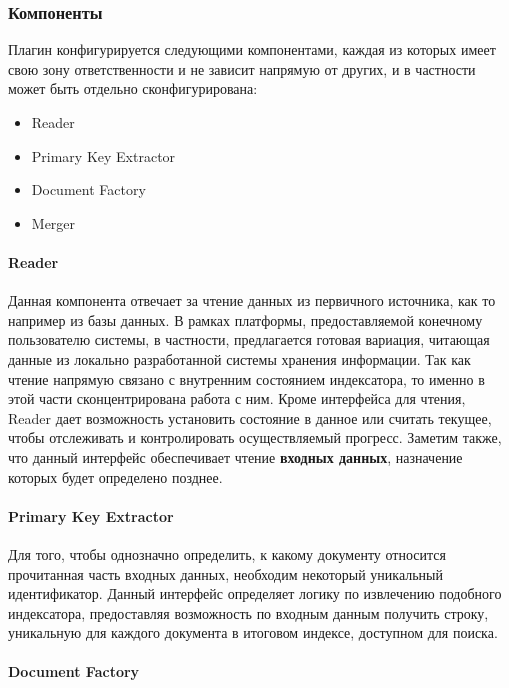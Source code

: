 \subsubsection{Компоненты}

Плагин конфигурируется следующими компонентами, каждая из которых имеет свою зону ответственности и не зависит напрямую от других, и в частности может быть отдельно сконфигурирована:

\begin{itemize}
	\item Reader
	\item Primary Key Extractor
	\item Document Factory
	\item Merger
\end{itemize}

\paragraph{Reader}

Данная компонента отвечает за чтение данных из первичного источника, как то например из базы данных. В рамках платформы, предоставляемой конечному пользователю системы, в частности, предлагается готовая вариация, читающая данные из локально разработанной системы хранения информации. Так как чтение напрямую связано с внутренним состоянием индексатора, то именно в этой части сконцентрирована работа с ним. Кроме интерфейса для чтения, Reader дает возможность установить состояние в данное или считать текущее, чтобы отслеживать и контролировать осуществляемый прогресс. Заметим также, что данный интерфейс обеспечивает чтение \textbf{входных данных}, назначение которых будет определено позднее.

\paragraph{Primary Key Extractor}

Для того, чтобы однозначно определить, к какому документу относится прочитанная часть входных данных, необходим некоторый уникальный идентификатор. Данный интерфейс определяет логику по извлечению подобного индексатора, предоставляя возможность по входным данным получить строку, уникальную для каждого документа в итоговом индексе, доступном для поиска.

\paragraph{Document Factory}

